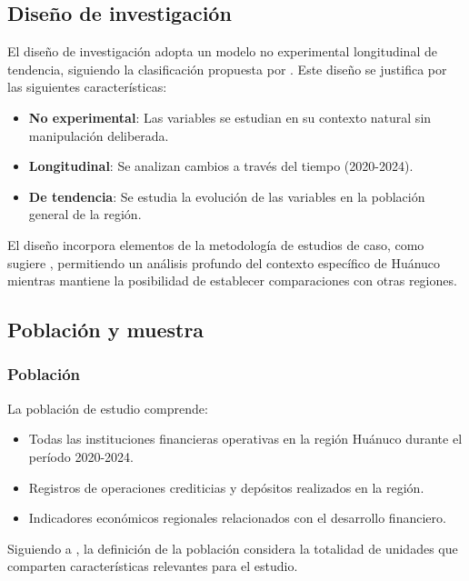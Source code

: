 \documentclass[12pt, a4paper]{article}
\begin{document}
\subsection{Diseño de investigación}

El diseño de investigación adopta un modelo no experimental longitudinal de tendencia, siguiendo la clasificación propuesta por \textcite{Sampieri2023}. Este diseño se justifica por las siguientes características:

\begin{itemize}
    \item \textbf{No experimental}: Las variables se estudian en su contexto natural sin manipulación deliberada.
    \item \textbf{Longitudinal}: Se analizan cambios a través del tiempo (2020-2024).
    \item \textbf{De tendencia}: Se estudia la evolución de las variables en la población general de la región.
\end{itemize}

El diseño incorpora elementos de la metodología de estudios de caso, como sugiere \textcite{Maxwell2022}, permitiendo un análisis profundo del contexto específico de Huánuco mientras mantiene la posibilidad de establecer comparaciones con otras regiones.

\subsection{Población y muestra}

\subsubsection{Población}
La población de estudio comprende:

\begin{itemize}
    \item Todas las instituciones financieras operativas en la región Huánuco durante el período 2020-2024.
    \item Registros de operaciones crediticias y depósitos realizados en la región.
    \item Indicadores económicos regionales relacionados con el desarrollo financiero.
\end{itemize}

Siguiendo a \textcite{Thompson2023}, la definición de la población considera la totalidad de unidades que comparten características relevantes para el estudio.
\end{document}
